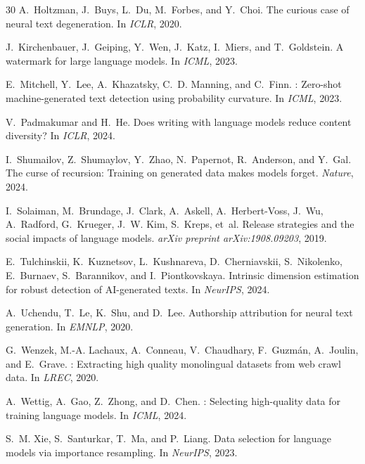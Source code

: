\documentclass[11pt]{article}
\begin{document}
\begin{thebibliography}{30}
A.~Holtzman, J.~Buys, L.~Du, M.~Forbes, and Y.~Choi.
\newblock The curious case of neural text degeneration.
\newblock In \emph{ICLR}, 2020.

J.~Kirchenbauer, J.~Geiping, Y.~Wen, J.~Katz, I.~Miers, and T.~Goldstein.
\newblock A watermark for large language models.
\newblock In \emph{ICML}, 2023.

E.~Mitchell, Y.~Lee, A.~Khazatsky, C.~D. Manning, and C.~Finn.
: Zero-shot machine-generated text detection using probability curvature.
\newblock In \emph{ICML}, 2023.

V.~Padmakumar and H.~He.
\newblock Does writing with language models reduce content diversity?
\newblock In \emph{ICLR}, 2024.

I.~Shumailov, Z.~Shumaylov, Y.~Zhao, N.~Papernot, R.~Anderson, and Y.~Gal.
\newblock The curse of recursion: Training on generated data makes models forget.
\newblock \emph{Nature}, 2024.

I.~Solaiman, M.~Brundage, J.~Clark, A.~Askell, A.~Herbert-Voss, J.~Wu, A.~Radford, G.~Krueger, J.~W. Kim, S.~Kreps, et~al.
\newblock Release strategies and the social impacts of language models.
\newblock \emph{arXiv preprint arXiv:1908.09203}, 2019.

E.~Tulchinskii, K.~Kuznetsov, L.~Kushnareva, D.~Cherniavskii, S.~Nikolenko, E.~Burnaev, S.~Barannikov, and I.~Piontkovskaya.
\newblock Intrinsic dimension estimation for robust detection of {AI}-generated texts.
\newblock In \emph{NeurIPS}, 2024.

A.~Uchendu, T.~Le, K.~Shu, and D.~Lee.
\newblock Authorship attribution for neural text generation.
\newblock In \emph{EMNLP}, 2020.

G.~Wenzek, M.-A. Lachaux, A.~Conneau, V.~Chaudhary, F.~Guzm{\'a}n, A.~Joulin, and E.~Grave.
: Extracting high quality monolingual datasets from web crawl data.
\newblock In \emph{LREC}, 2020.

A.~Wettig, A.~Gao, Z.~Zhong, and D.~Chen.
: Selecting high-quality data for training language models.
\newblock In \emph{ICML}, 2024.

S.~M. Xie, S.~Santurkar, T.~Ma, and P.~Liang.
\newblock Data selection for language models via importance resampling.
\newblock In \emph{NeurIPS}, 2023.

\end{thebibliography}
\end{document}
